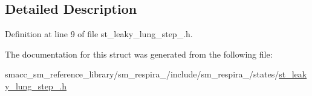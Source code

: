 \subsection{Detailed Description}


Definition at line 9 of file st\+\_\+leaky\+\_\+lung\+\_\+step\+\_.\+h.



The documentation for this struct was generated from the following file\+:\begin{DoxyCompactItemize}
\item 
smacc\+\_\+sm\+\_\+reference\+\_\+library/sm\+\_\+respira\+\_/include/sm\+\_\+respira\+\_/states/\hyperlink{st__leaky__lung__step__1_8h}{st\+\_\+leaky\+\_\+lung\+\_\+step\+\_.\+h}\end{DoxyCompactItemize}
